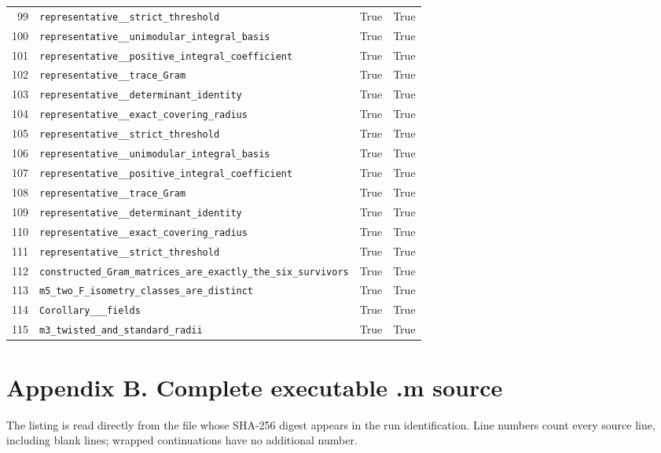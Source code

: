 \documentclass[12pt]{amsart}
\theoremstyle{remark}
\theoremstyle{definition}
\numberwithin{equation}{section}
\begin{document}
\begin{longtable}{rL{11cm}cc}
99 & \texttt{representative\_\_\allowbreak strict\_\allowbreak threshold} & True & True \\
100 & \texttt{representative\_\_\allowbreak unimodular\_\allowbreak integral\_\allowbreak basis} & True & True \\
101 & \texttt{representative\_\_\allowbreak positive\_\allowbreak integral\_\allowbreak coefficient} & True & True \\
102 & \texttt{representative\_\_\allowbreak trace\_\allowbreak Gram} & True & True \\
103 & \texttt{representative\_\_\allowbreak determinant\_\allowbreak identity} & True & True \\
104 & \texttt{representative\_\_\allowbreak exact\_\allowbreak covering\_\allowbreak radius} & True & True \\
105 & \texttt{representative\_\_\allowbreak strict\_\allowbreak threshold} & True & True \\
106 & \texttt{representative\_\_\allowbreak unimodular\_\allowbreak integral\_\allowbreak basis} & True & True \\
107 & \texttt{representative\_\_\allowbreak positive\_\allowbreak integral\_\allowbreak coefficient} & True & True \\
108 & \texttt{representative\_\_\allowbreak trace\_\allowbreak Gram} & True & True \\
109 & \texttt{representative\_\_\allowbreak determinant\_\allowbreak identity} & True & True \\
110 & \texttt{representative\_\_\allowbreak exact\_\allowbreak covering\_\allowbreak radius} & True & True \\
111 & \texttt{representative\_\_\allowbreak strict\_\allowbreak threshold} & True & True \\
112 & \texttt{constructed\_\allowbreak Gram\_\allowbreak matrices\_\allowbreak are\_\allowbreak exactly\_\allowbreak the\_\allowbreak six\_\allowbreak survivors} & True & True \\
113 & \texttt{m5\_\allowbreak two\_\allowbreak F\_\allowbreak isometry\_\allowbreak classes\_\allowbreak are\_\allowbreak distinct} & True & True \\
114 & \texttt{Corollary\_\_\_\allowbreak fields} & True & True \\
115 & \texttt{m3\_\allowbreak twisted\_\allowbreak and\_\allowbreak standard\_\allowbreak radii} & True & True \\
\end{longtable}
\endgroup

\clearpage
\section*{Appendix B. Complete executable .m source}
The listing is read directly from the file whose SHA-256 digest appears
in the run identification. Line numbers count every source line, including
blank lines; wrapped continuations have no additional number.

\end{document}
